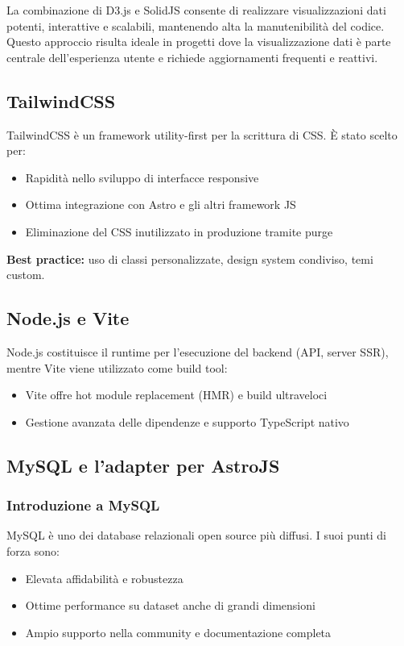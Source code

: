 La combinazione di D3.js e SolidJS consente di realizzare visualizzazioni dati potenti, interattive e scalabili, mantenendo alta la manutenibilità del codice. Questo approccio risulta ideale in progetti dove la visualizzazione dati è parte centrale dell’esperienza utente e richiede aggiornamenti frequenti e reattivi.

\subsection{TailwindCSS}
TailwindCSS è un framework utility-first per la scrittura di CSS. È stato scelto per:
\begin{itemize}
    \item Rapidità nello sviluppo di interfacce responsive
    \item Ottima integrazione con Astro e gli altri framework JS
    \item Eliminazione del CSS inutilizzato in produzione tramite purge
\end{itemize}
\textbf{Best practice:} uso di classi personalizzate, design system condiviso, temi custom.

\subsection{Node.js e Vite}
Node.js costituisce il runtime per l’esecuzione del backend (API, server SSR), mentre Vite viene utilizzato come build tool:
\begin{itemize}
    \item Vite offre hot module replacement (HMR) e build ultraveloci
    \item Gestione avanzata delle dipendenze e supporto TypeScript nativo
\end{itemize}

\subsection{MySQL e l’adapter per AstroJS}

\subsubsection{Introduzione a MySQL}
MySQL è uno dei database relazionali open source più diffusi. I suoi punti di forza sono:
\begin{itemize}
    \item Elevata affidabilità e robustezza
    \item Ottime performance su dataset anche di grandi dimensioni
    \item Ampio supporto nella community e documentazione completa
\end{itemize}

